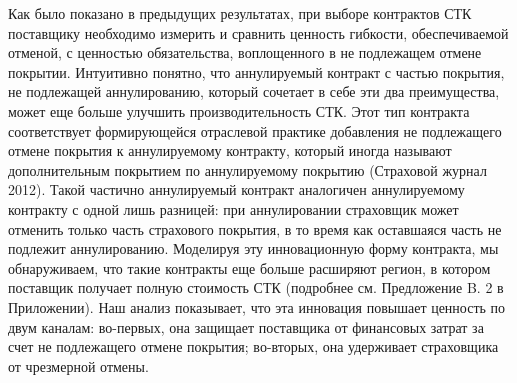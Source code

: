 \documentclass[a4paper,12pt]{article}
\begin{document}
Как было показано в предыдущих результатах, при выборе контрактов СТК поставщику необходимо измерить и сравнить ценность гибкости, обеспечиваемой отменой, с ценностью обязательства, воплощенного в не подлежащем отмене покрытии. Интуитивно понятно, что аннулируемый контракт с частью покрытия, не подлежащей аннулированию, который сочетает в себе эти два преимущества, может еще больше улучшить производительность СТК. Этот тип контракта соответствует формирующейся отраслевой практике добавления не подлежащего отмене покрытия к аннулируемому контракту, который иногда называют дополнительным покрытием по аннулируемому покрытию (Страховой журнал 2012). Такой частично аннулируемый контракт аналогичен аннулируемому контракту с одной лишь разницей: при аннулировании страховщик может отменить только часть страхового покрытия, в то время как оставшаяся часть не подлежит аннулированию. Моделируя эту инновационную форму контракта, мы обнаруживаем, что такие контракты еще больше расширяют регион, в котором поставщик получает полную стоимость СТК (подробнее см. Предложение B. 2 в Приложении). Наш анализ показывает, что эта инновация повышает ценность по двум каналам: во-первых, она защищает поставщика от финансовых затрат за счет не подлежащего отмене покрытия; во-вторых, она удерживает страховщика от чрезмерной отмены.
\end{document}
